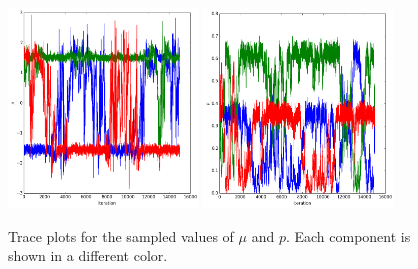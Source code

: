 \documentclass[11pt]{article}
\begin{document}
    \begin{figure}[h]
    \centering
    \includegraphics[width = 0.45\textwidth]{out/mu.png}
    \includegraphics[width = 0.45\textwidth]{out/p.png}
    \caption{Trace plots for the sampled values of $\mu$ and $p$.
    Each component is shown in a different color.}
    \label{fig:mix.trace}
    \end{figure}
\end{document}
